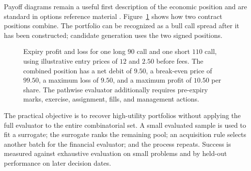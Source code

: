 \documentclass{strategynet-journal}
\begin{document}
Payoff diagrams remain a useful first description of the economic position
and are standard in options reference material \cite{occquickguide}.
Figure~\ref{fig:call-spread-payoff} shows how two contract positions combine.
The portfolio can be recognized as a bull call spread after it has been
constructed; candidate generation uses the two signed positions.

\begin{figure}[tbp]
  \centering
  \caption{Expiry profit and loss for one long \(90\) call and one short
  \(110\) call, using illustrative entry prices of \(12\) and \(2.50\)
  before fees.  The
  combined position has a net debit of \(9.50\), a break-even price of
  \(99.50\), a maximum loss of \(9.50\), and a maximum profit of \(10.50\)
  per share.  The pathwise evaluator additionally requires pre-expiry marks,
  exercise, assignment, fills, and management actions.}
  \label{fig:call-spread-payoff}
\end{figure}

The practical objective is to recover high-utility portfolios without applying
the full evaluator to the entire combinatorial set.  A small evaluated sample
is used to fit a surrogate; the surrogate ranks the remaining pool; an
acquisition rule selects another batch for the financial evaluator; and the
process repeats.  Success is measured against exhaustive evaluation on small
problems and by held-out performance on later decision dates.
\end{document}
